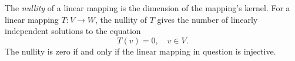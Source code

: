 \documentclass[12pt]{article}
\begin{document}
The \emph{nullity} of a linear mapping is the dimension of the mapping's kernel.
For a linear mapping $T:V\rightarrow W$, the nullity of $T$ gives the
number of linearly independent solutions to the equation
$$T(v)=0,\quad v\in V.$$
The nullity is zero if and only if the linear
mapping in question is injective.
\end{document}
